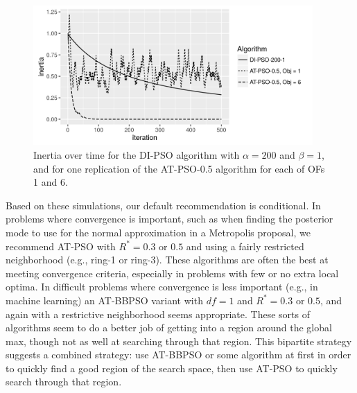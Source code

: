 \documentclass[12pt]{article}
\begin{document}
\begin{appendix}
\begin{figure}[!ht]
\centering
\includegraphics[width=0.95\textwidth]{psosims/inertiaplot.png}
\caption{Inertia over time for the DI-PSO algorithm with $\alpha=200$ and $\beta=1$, and for one replication of the AT-PSO-0.5 algorithm for each of OFs 1 and 6.}
\label{fig:inertia}
\end{figure}


Based on these simulations, our default recommendation is conditional. In problems where convergence is important, such as when finding the posterior mode to use for the normal approximation in a Metropolis proposal, we recommend AT-PSO with $R^*=0.3$ or $0.5$ and using a fairly restricted neighborhood (e.g., ring-1 or ring-3). These algorithms are often the best at meeting convergence criteria, especially in problems with few or no extra local optima. In difficult problems where convergence is less important (e.g., in machine learning) an AT-BBPSO variant with $df=1$ and $R^*=0.3$ or $0.5$, and again with a restrictive neighborhood seems appropriate. These sorts of algorithms seem to do a better job of getting into a region around the global max, though not as well at searching through that region. This bipartite strategy suggests a combined strategy: use AT-BBPSO or some algorithm  at first in order to quickly find a good region of the search space, then use AT-PSO to quickly search through that region. 


\end{appendix}
\end{document}
